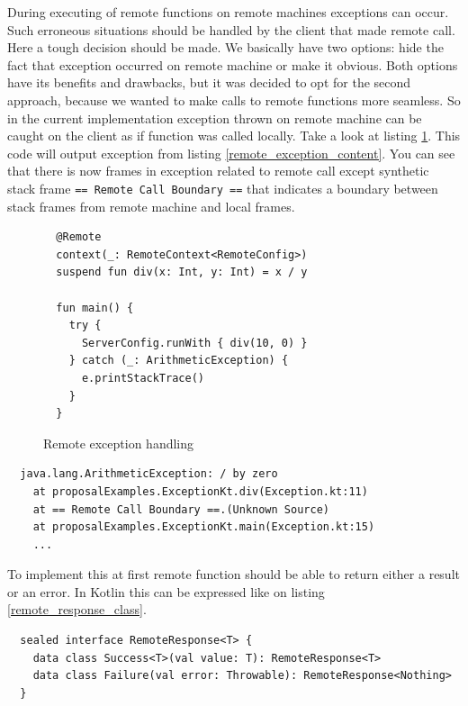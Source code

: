 \documentclass[a4paper,11pt,oneside]{article}
\begin{document}
During executing of remote functions on remote machines exceptions can occur. Such erroneous situations
should be handled by the client that made remote call. Here a tough decision should be made. We basically
have two options: hide the fact that exception occurred on remote machine or make it obvious. Both options
have its benefits and drawbacks, but it was decided to opt for the second approach, because we wanted 
to make calls to remote functions more seamless. So
in the current implementation exception thrown on remote machine can be caught on the client as if
function was called locally. Take a look at listing \ref{remote_exception}. This code will output 
exception from listing \ref{remote_exception_content}. You can see that there is now frames in exception
related to remote call except synthetic stack frame \texttt{== Remote Call Boundary ==} that indicates
a boundary between stack frames from remote machine and local frames. 

\begin{figure}[!h]
  \begin{verbatim}
  @Remote
  context(_: RemoteContext<RemoteConfig>)
  suspend fun div(x: Int, y: Int) = x / y

  fun main() {
    try {
      ServerConfig.runWith { div(10, 0) }
    } catch (_: ArithmeticException) {
      e.printStackTrace()
    }
  }
  \end{verbatim}
  \caption{Remote exception handling}\label{remote_exception}
\end{figure}

\begin{listing}[!h]
  \begin{verbatim}
  java.lang.ArithmeticException: / by zero
    at proposalExamples.ExceptionKt.div(Exception.kt:11)
    at == Remote Call Boundary ==.(Unknown Source)
    at proposalExamples.ExceptionKt.main(Exception.kt:15)
    ...
  \end{verbatim}
  \caption{Remote exception content}\label{remote_exception_content}
\end{listing}

To implement this at first remote function should be able to return either a result or an error. In Kotlin
this can be expressed like on listing \ref{remote_response_class}.

\begin{listing}[!h]
  \begin{verbatim}
  sealed interface RemoteResponse<T> {
    data class Success<T>(val value: T): RemoteResponse<T>
    data class Failure(val error: Throwable): RemoteResponse<Nothing>
  }
  \end{verbatim}
  \caption{Return type of remote functions}\label{remote_response_class}
\end{listing}
\end{document}
